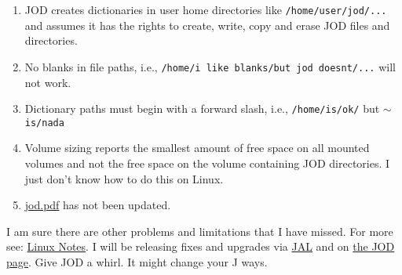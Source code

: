\begin{enumerate}
\tightlist
\item
  JOD creates dictionaries in user home directories like
  \texttt{/home/user/jod/...} and assumes it has the rights to create,
  write, copy and erase JOD files and directories.
\item
  No blanks in file paths, i.e., \texttt{/home/i like blanks/but jod doesnt/...}
  will not work.
\item
  Dictionary paths must begin with a forward slash, i.e., \texttt{/home/is/ok/}
  but \ensuremath{\sim}\texttt{is/nada}
\item
  Volume sizing reports the smallest amount of free space on all mounted
  volumes and not the free space on the volume containing JOD
  directories. I just don't know how to do this on Linux.
\item
  \href{https://github.com/bakerjd99/jod/blob/master/joddocument/pdfdoc/jod.pdf}{jod.pdf} has not been
  updated.
\end{enumerate}
I am sure there are other problems and limitations that I have missed.
For more see:
\href{https://docs.google.com/document/d/18pwvvpeuJiU\_HCsuReiKyOxmZORrlMRe45OYE\_cWq0w/edit?hl=en\_US}{Linux
Notes}. I will be releasing fixes and upgrades via
\href{http://www.jsoftware.com/jwiki/JAL/User\%20Guide}{JAL} and on
\href{http://bakerjd99.wordpress.com/the-jod-page/}{the JOD page}. Give
JOD a whirl. It might change your J ways.


%


%